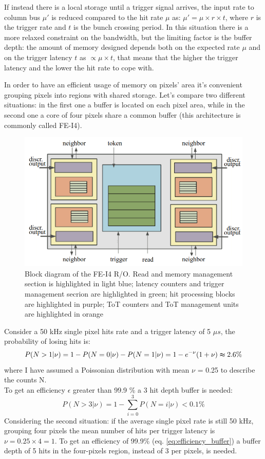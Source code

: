    If instead there is a local storage until a trigger signal arrives, the input rate to column bus $\mu '$ is reduced compared to the hit rate $\mu$ as: $\mu'=\mu \times r \times t$, where $r$ is the trigger rate and $t$ is the bunch crossing period.
   In this situation there is a more relaxed constraint on the bandwidth, but the limiting factor is the buffer depth: the  amount of memory designed depends both on the expected rate $\mu$ and on the trigger latency $t$ as $\propto\mu \times t$, that means that the higher the trigger latency and the lower the hit rate to cope with. 

   In order to have an efficient usage of memory on pixels' area it's convenient grouping pixels into regions with shared storage. Let's compare two different situations: in the first one a buffer is located on each pixel area, while in the second one a core of four pixels share a common buffer (this architecture is commonly called FE-I4). \\
   \begin{figure}[h!]
      \centering
      \includegraphics[width=.7\linewidth]{figures/Pixel_detectors/core.png}
      \caption{Block diagram of the FE-I4 R/O. Read and memory
      management section is highlighted in light blue; latency counters and
      trigger management secrion are highlighted in green; hit processing blocks
      are highlighted in purple; ToT counters and ToT management units are
      highlighted in orange}
      \label{fig:core}
   \end{figure}
   Consider a 50 kHz single pixel hits rate and a trigger latency of 5 $\mu s$, the probability of losing hits is: 
   \begin{equation}
      P(N > 1 | \nu) = 1-P(N = 0 | \nu) - P(N = 1 | \nu) = 1 - e^{-\nu} (1+\nu) \thickapprox 2.6 \% 
   \end{equation}    
   where I have assumed a Poissonian distribution with mean $\nu$ = 0.25 to describe the counts N.\\
   To get an efficiency $\epsilon$ greater than 99.9 \% a 3 hit depth buffer is needed: 
   \begin{equation}
      P(N > 3 | \nu) = 1-\sum_{i=0}^{3} P(N = i | \nu) < 0.1\%  
   \label{eq:efficiency_buffer}
   \end{equation} 
   Considering the second situation: if the average single pixel rate is still 50 kHz, grouping four pixels the mean number of hits per trigger latency is $\nu = 0.25 \times 4 = 1$. To get an efficiency of 99.9\% (eq. \ref{eq:efficiency_buffer}) a buffer depth of 5 hits in the four-pixels region, instead of 3 per pixels, is needed. 


